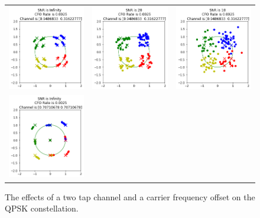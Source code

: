 \setlength{\tabcolsep}{0pt}
\begin{figure}
  \centering
  \label{fig:multi_tap_cfo}\caption{The effects of a two tap channel and a carrier frequency offset on the QPSK constellation.}
  \begin{tabular}{ccc}
    \includegraphics[width=45mm]{figures/cfo_equal_intro/snr_0_c3/cfo_0.png}&
    \includegraphics[width=45mm]{figures/cfo_equal_intro/snr_20_c3/cfo_0.png}&
    \includegraphics[width=45mm]{figures/cfo_equal_intro/snr_10_c3/cfo_0.png}\\
    \includegraphics[width=45mm]{figures/cfo_equal_intro/snr_0_c2/cfo_0.png}&

\end{tabular}
\end{figure}
